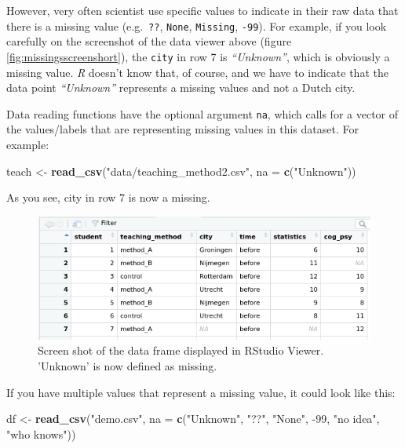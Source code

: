 \documentclass[
]{scrartcl}
\newenvironment{Shaded}{\begin{snugshade}}{\end{snugshade}}
\newcommand{\DataTypeTok}[1]{\textcolor[rgb]{0.13,0.29,0.53}{#1}}
\newcommand{\DecValTok}[1]{\textcolor[rgb]{0.00,0.00,0.81}{#1}}
\newcommand{\KeywordTok}[1]{\textcolor[rgb]{0.13,0.29,0.53}{\textbf{#1}}}
\newcommand{\NormalTok}[1]{#1}
\newcommand{\StringTok}[1]{\textcolor[rgb]{0.31,0.60,0.02}{#1}}
\begin{document}
However, very often scientist use specific values to indicate in their raw data that there is a missing value (e.g.~\texttt{??}, \texttt{None}, \texttt{Missing}, \texttt{-99}). For example, if you look carefully on the screenshot of the data viewer above (figure \ref{fig:missingsscreenshort}), the \texttt{city} in row 7 is \emph{``Unknown''}, which is obviously a missing value. \emph{R} doesn't know that, of course, and we have to indicate that the data point \emph{``Unknown''} represents a missing values and not a Dutch city.

Data reading functions have the optional argument \texttt{na}, which calls for a vector of the values/labels that are representing missing values in this dataset. For example:

\begin{Shaded}
\begin{Highlighting}[]
\NormalTok{teach \textless{}{-}}\StringTok{ }\KeywordTok{read\_csv}\NormalTok{(}\StringTok{"data/teaching\_method2.csv"}\NormalTok{, }\DataTypeTok{na =} \KeywordTok{c}\NormalTok{(}\StringTok{"Unknown"}\NormalTok{))}
\end{Highlighting}
\end{Shaded}

As you see, city in row 7 is now a missing.

\begin{figure}

{\centering \includegraphics[width=500px]{images/missings} 

}

\caption{Screen shot of the data frame displayed in RStudio Viewer. 'Unknown' is now defined as missing.}\label{fig:unnamed-chunk-210}
\end{figure}

If you have multiple values that represent a missing value, it could look like this:

\begin{Shaded}
\begin{Highlighting}[]
\NormalTok{df \textless{}{-}}\StringTok{ }\KeywordTok{read\_csv}\NormalTok{(}\StringTok{"demo.csv"}\NormalTok{, }\DataTypeTok{na =} \KeywordTok{c}\NormalTok{(}\StringTok{"Unknown"}\NormalTok{, }\StringTok{"??"}\NormalTok{, }\StringTok{"None"}\NormalTok{, }\DecValTok{{-}99}\NormalTok{,  }\StringTok{"no idea"}\NormalTok{, }\StringTok{"who knows"}\NormalTok{))}
\end{Highlighting}
\end{Shaded}
\end{document}
